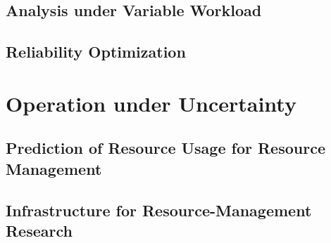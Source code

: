 \documentclass[english]{style}
\begin{document}
\section{Analysis under Variable Workload}
\section{Reliability Optimization}

\chapter{Operation under Uncertainty}
\section{Prediction of Resource Usage for Resource Management}
\section{Infrastructure for Resource-Management Research}



\printbibliography
\end{document}
